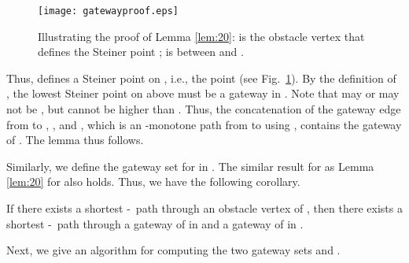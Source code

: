 \documentclass[english,runningheads,11pt]{llncs}
\def\st{-}
\newenvironment{proof}{\noindent {\textbf{Proof:}}\rm}{\hfill \rm}
\begin{document}
\begin{proof}
\begin{figure}[t]
\begin{minipage}[t]{\linewidth}
\begin{center}
\texttt{[image: gatewayproof.eps]}
\caption{\footnotesize Illustrating the proof of Lemma \ref{lem:20}:
 is the obstacle vertex that defines the Steiner point ; 
is between  and .}
\label{fig:gatewayproof}
\end{center}
\end{minipage}
\vspace*{-0.15in}
\end{figure}

Thus,  defines a Steiner point on , i.e., the point
 (see Fig.~\ref{fig:gatewayproof}).
By the definition of , the
lowest Steiner point  on  above  must be a gateway in
. Note that  may or may not be , but 
cannot be higher than . Thus, the concatenation of the
gateway edge from  to , , and
, which is an -monotone path from  to
 using , contains the gateway  of .
The lemma thus follows.
\end{proof}

Similarly, we define the gateway set  for  in .
The similar result for  as Lemma \ref{lem:20} for  also holds. Thus, we have
the following corollary.

\begin{corollary}\label{cor:10}
If there exists a shortest \st\ path through an obstacle vertex of
, then there exists a shortest \st\ path through a gateway of
 in  and a gateway of  in .
\end{corollary}

Next, we give an algorithm for computing the two gateway sets  and
.
\end{document}
